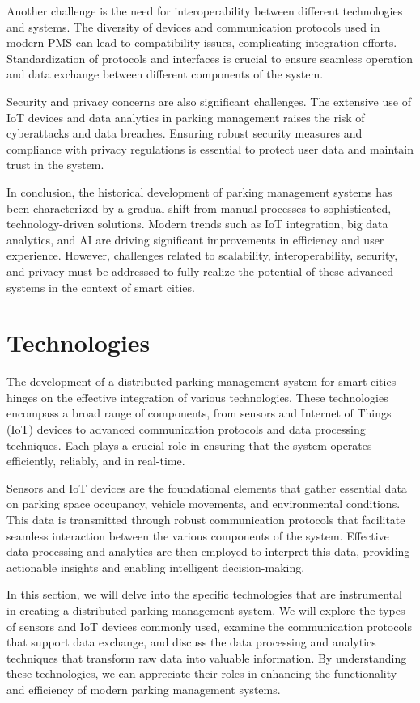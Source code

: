 \documentclass[oneside, 12pt, a4paper, draft]{book}
\begin{document}
Another challenge is the need for interoperability between different technologies and systems. The diversity of devices and communication protocols used in modern PMS can lead to compatibility issues, complicating integration efforts. Standardization of protocols and interfaces is crucial to ensure seamless operation and data exchange between different components of the system.

Security and privacy concerns are also significant challenges. The extensive use of IoT devices and data analytics in parking management raises the risk of cyberattacks and data breaches. Ensuring robust security measures and compliance with privacy regulations is essential to protect user data and maintain trust in the system.

In conclusion, the historical development of parking management systems has been characterized by a gradual shift from manual processes to sophisticated, technology-driven solutions. Modern trends such as IoT integration, big data analytics, and AI are driving significant improvements in efficiency and user experience. However, challenges related to scalability, interoperability, security, and privacy must be addressed to fully realize the potential of these advanced systems in the context of smart cities.
\chapter{Technologies}
\label{sec:org2097d3c}
The development of a distributed parking management system for smart cities hinges on the effective integration of various technologies. These technologies encompass a broad range of components, from sensors and Internet of Things (IoT) devices to advanced communication protocols and data processing techniques. Each plays a crucial role in ensuring that the system operates efficiently, reliably, and in real-time.

Sensors and IoT devices are the foundational elements that gather essential data on parking space occupancy, vehicle movements, and environmental conditions. This data is transmitted through robust communication protocols that facilitate seamless interaction between the various components of the system. Effective data processing and analytics are then employed to interpret this data, providing actionable insights and enabling intelligent decision-making.

In this section, we will delve into the specific technologies that are instrumental in creating a distributed parking management system. We will explore the types of sensors and IoT devices commonly used, examine the communication protocols that support data exchange, and discuss the data processing and analytics techniques that transform raw data into valuable information. By understanding these technologies, we can appreciate their roles in enhancing the functionality and efficiency of modern parking management systems.
\end{document}

